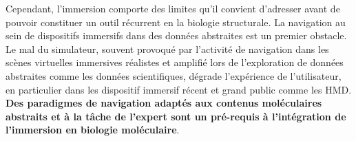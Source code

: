 

Cependant, l'immersion comporte des limites qu'il convient d'adresser avant de pouvoir constituer un outil récurrent en la biologie structurale. La navigation au sein de dispositifs immersifs dans des données abstraites est un premier obstacle. Le mal du simulateur, souvent provoqué par l'activité de navigation dans les scènes virtuelles immersives réalistes et amplifié lors de l'exploration de données abstraites comme les données scientifiques, dégrade l'expérience de l'utilisateur, en particulier dans les dispositif immersif récent et grand public comme les HMD. \textbf{Des paradigmes de navigation adaptés aux contenus moléculaires abstraits et à la tâche de l'expert sont un pré-requis à l'intégration de l'immersion en biologie moléculaire}.

